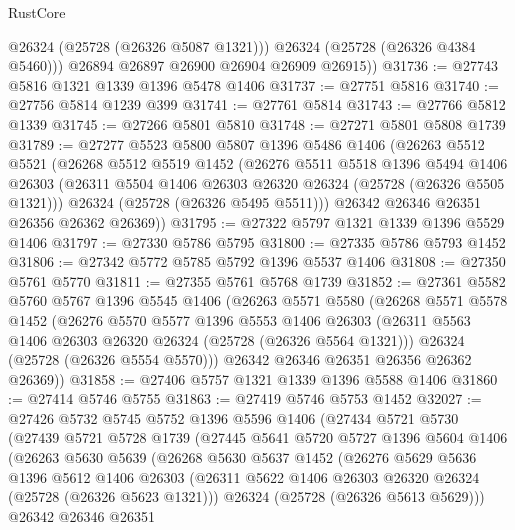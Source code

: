 \begin{lexlean}{RustCore}
\begin{coremodule}
            @26324
            (@25728 (@26326 @5087 @1321)))
          @26324
          (@25728 (@26326 @4384 @5460)))
        @26894
        @26897
        @26900
        @26904
        @26909
        @26915))
@31736 := @27743 @5816 @1321 @1339 @1396 @5478 @1406
@31737 := @27751 @5816
@31740 := @27756 @5814 @1239 @399
@31741 := @27761 @5814
@31743 := @27766 @5812 @1339
@31745 := @27266 @5801 @5810
@31748 := @27271 @5801 @5808 @1739
@31789 := @27277
    @5523
    @5800
    @5807
    @1396
    @5486
    @1406
    (@26263
      @5512
      @5521
      (@26268
        @5512
        @5519
        @1452
        (@26276
          @5511
          @5518
          @1396
          @5494
          @1406
          @26303
          (@26311 @5504 @1406 @26303 @26320 @26324 (@25728 (@26326 @5505 @1321)))
          @26324
          (@25728 (@26326 @5495 @5511)))
        @26342
        @26346
        @26351
        @26356
        @26362
        @26369))
@31795 := @27322 @5797 @1321 @1339 @1396 @5529 @1406
@31797 := @27330 @5786 @5795
@31800 := @27335 @5786 @5793 @1452
@31806 := @27342 @5772 @5785 @5792 @1396 @5537 @1406
@31808 := @27350 @5761 @5770
@31811 := @27355 @5761 @5768 @1739
@31852 := @27361
    @5582
    @5760
    @5767
    @1396
    @5545
    @1406
    (@26263
      @5571
      @5580
      (@26268
        @5571
        @5578
        @1452
        (@26276
          @5570
          @5577
          @1396
          @5553
          @1406
          @26303
          (@26311 @5563 @1406 @26303 @26320 @26324 (@25728 (@26326 @5564 @1321)))
          @26324
          (@25728 (@26326 @5554 @5570)))
        @26342
        @26346
        @26351
        @26356
        @26362
        @26369))
@31858 := @27406 @5757 @1321 @1339 @1396 @5588 @1406
@31860 := @27414 @5746 @5755
@31863 := @27419 @5746 @5753 @1452
@32027 := @27426
    @5732
    @5745
    @5752
    @1396
    @5596
    @1406
    (@27434
      @5721
      @5730
      (@27439
        @5721
        @5728
        @1739
        (@27445
          @5641
          @5720
          @5727
          @1396
          @5604
          @1406
          (@26263
            @5630
            @5639
            (@26268
              @5630
              @5637
              @1452
              (@26276
                @5629
                @5636
                @1396
                @5612
                @1406
                @26303
                (@26311 @5622 @1406 @26303 @26320 @26324 (@25728 (@26326 @5623 @1321)))
                @26324
                (@25728 (@26326 @5613 @5629)))
              @26342
              @26346
              @26351

\end{coremodule}
\end{lexlean}
